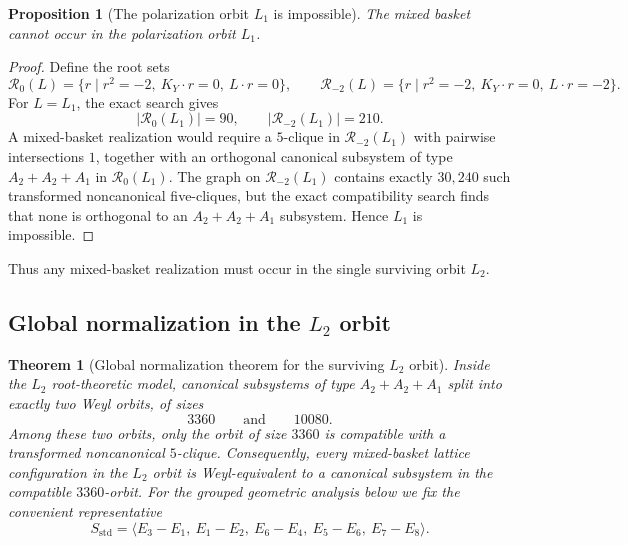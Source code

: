 \documentclass[11pt]{article}
\newtheorem{theorem}{Theorem}[section]
\newtheorem{proposition}[proposition]{Proposition}
\theoremstyle{definition}
\begin{document}
\begin{proposition}[The polarization orbit $L_1$ is impossible]\label{prop:L1-impossible}
The mixed basket cannot occur in the polarization orbit $L_1$.
\end{proposition}

\begin{proof}
Define the root sets
\[
\mathcal R_0(L)=\{r\mid r^2=-2,\ K_Y\cdot r=0,\ L\cdot r=0\},
\qquad
\mathcal R_{-2}(L)=\{r\mid r^2=-2,\ K_Y\cdot r=0,\ L\cdot r=-2\}.
\]
For $L=L_1$, the exact search gives
\[
|\mathcal R_0(L_1)|=90,
\qquad
|\mathcal R_{-2}(L_1)|=210.
\]
A mixed-basket realization would require a $5$-clique in $\mathcal R_{-2}(L_1)$ with pairwise intersections $1$, together with an orthogonal canonical subsystem of type $A_2+A_2+A_1$ in $\mathcal R_0(L_1)$. The graph on $\mathcal R_{-2}(L_1)$ contains exactly $30{,}240$ such transformed noncanonical five-cliques, but the exact compatibility search finds that none is orthogonal to an $A_2+A_2+A_1$ subsystem. Hence $L_1$ is impossible.
\end{proof}

Thus any mixed-basket realization must occur in the single surviving orbit $L_2$.

\subsection{Global normalization in the $L_2$ orbit}

\begin{theorem}[Global normalization theorem for the surviving $L_2$ orbit]\label{thm:L2-global-normalization}
Inside the $L_2$ root-theoretic model, canonical subsystems of type $A_2+A_2+A_1$ split into exactly two Weyl orbits, of sizes
\[
3360\qquad\text{and}\qquad 10080.
\]
Among these two orbits, only the orbit of size $3360$ is compatible with a transformed noncanonical $5$-clique. Consequently, every mixed-basket lattice configuration in the $L_2$ orbit is Weyl-equivalent to a canonical subsystem in the compatible $3360$-orbit. For the grouped geometric analysis below we fix the convenient representative
\[
S_{\mathrm{std}}=\langle E_3-E_1,\ E_1-E_2,\ E_6-E_4,\ E_5-E_6,\ E_7-E_8\rangle.
\]
\end{theorem}
\end{document}
